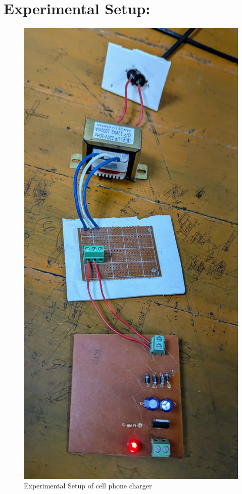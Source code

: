 \documentclass[a4paper,12pt]{article}
\begin{document}
	
	\section*{Experimental Setup:}
		\begin{figure}[H]
		\centering
		\includegraphics[angle=270,width=1 \linewidth]{"Images/4"}
	
		\caption{Experimental Setup of cell phone charger}
	\end{figure}
	\newpage
\end{document}
